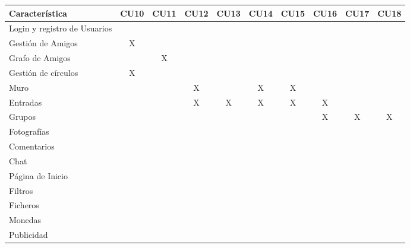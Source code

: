 \documentclass[12pt, a4paper, titlepage]{article}
\begin{document}
\begin{center}

\begin{tabular}{|p{3cm}|c|c|c|c|c|c|c|c|c|}
\hline 
\textbf{Característica} & CU10 & CU11  & CU12 & CU13 & CU14 & CU15 & CU16 & CU17 & CU18 \\ 
\hline 
Login y registro de Usuarios&   &    &   &   &   &   &   &   &   \\ 
\hline 
Gestión de Amigos & X  &    &   &   &   &   &   &   &   \\ 
\hline 
Grafo de Amigos&   &  X  &   &   &   &   &   &   &   \\ 
\hline 
Gestión de círculos&  X &    &   &   &   &   &   &   &   \\ 
\hline 
Muro&   &    & X  &   & X  & X  &   &   &   \\ 
\hline 
Entradas&   &    & X  &  X & X  & X  & X  &   &   \\ 
\hline 
Grupos &   &    &   &   &   &   & X  & X  & X  \\ 
\hline 
Fotografías &   &    &   &   &   &   &   &   &   \\ 
\hline 
Comentarios &   &    &   &   &   &   &   &   &   \\ 
\hline 
Chat&   &    &   &   &   &   &   &   &   \\ 
\hline 
Página de Inicio &   &    &   &   &   &   &   &   &   \\ 
\hline 
Filtros &   &    &   &   &   &   &   &   &   \\ 
\hline 
Ficheros &   &    &   &   &   &   &   &   &   \\  
\hline 
Monedas &   &    &   &   &   &   &   &   &   \\ 
\hline 
Publicidad &   &    &   &   &   &   &   &   &   \\ 
\hline  
\end{tabular} 



\end{center}
\end{document}
